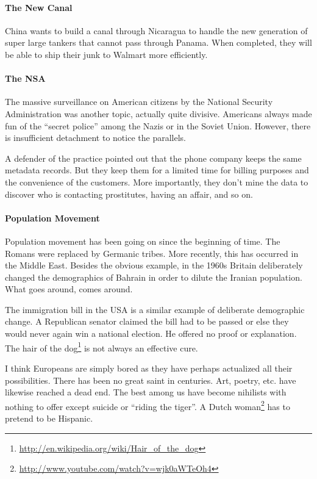 \paragraph{The New Canal}


China wants to build a canal through Nicaragua to handle the new generation of super large tankers that cannot pass through Panama. When completed, they will be able to ship their junk to Walmart more efficiently.

\paragraph{The NSA}


The massive surveillance on American citizens by the National Security Administration was another topic, actually quite divisive. Americans always made fun of the ``secret police'' among the Nazis or in the Soviet Union. However, there is insufficient detachment to notice the parallels.

A defender of the practice pointed out that the phone company keeps the same metadata records. But they keep them for a limited time for billing purposes and the convenience of the customers. More importantly, they don't mine the data to discover who is contacting prostitutes, having an affair, and so on.

\paragraph{Population Movement}


Population movement has been going on since the beginning of time. The Romans were replaced by Germanic tribes. More recently, this has occurred in the Middle East. Besides the obvious example, in the 1960s Britain deliberately changed the demographics of Bahrain in order to dilute the Iranian population. What goes around, comes around.

The immigration bill in the USA is a similar example of deliberate demographic change. A Republican senator claimed the bill had to be passed or else they would never again win a national election. He offered no proof or explanation. The hair of the dog\footnote{\url{http://en.wikipedia.org/wiki/Hair\_of\_the\_dog}} is not always an effective cure.

I think Europeans are simply bored as they have perhaps actualized all their possibilities. There has been no great saint in centuries. Art, poetry, etc. have likewise reached a dead end. The best among us have become nihilists with nothing to offer except suicide or ``riding the tiger''. A Dutch woman\footnote{\url{http://www.youtube.com/watch?v=wjk0aWTeOh4}} has to pretend to be Hispanic.


